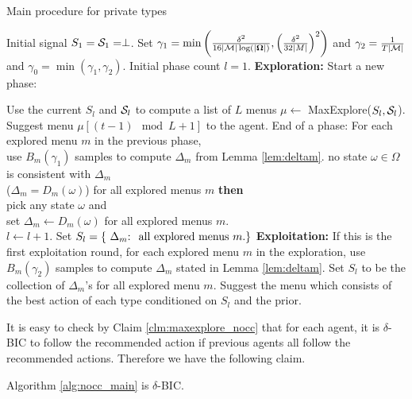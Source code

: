 \newcommand{\TAB}{\hspace{3mm}}

 \begin{algorithm}[t]
    \caption{Main procedure for private types }
    	\label{alg:nocc_main}
    \begin{algorithmic}[1]
    	\STATE Initial signal $S_1 = \S_1= \perp$.
    	\STATE Set $\gamma_1 =\min\left(\frac{\delta^2}{16|\M|\log(|\varOmega|)},\left( \frac{\delta^2}{32|M|}\right)^2\right)$ and $\gamma_2 =  \frac{1}{T|\M|}$ and $\gamma_0=\min(\gamma_1,\gamma_2)$.
	\STATE Initial phase count $l = 1$.
		\STATE \textbf{Exploration:}
			\STATE Start a new phase:
			
			\STATE Use the current $S_l$ and $\S_l$ to compute a list of $L$ menus $\mu \leftarrow $ MaxExplore($S_l, \S_l$).
		\ENDIF
		\STATE Suggest menu $\mu [ (t-1) \mod L + 1]$ to the agent.
			\STATE End of a phase:
			\STATE For each explored menu $m$ in the previous phase, \\
            \TAB use $B_m(\gamma_1)$ samples to compute $\Delta_m$ from Lemma \ref{lem:deltam}.
			 no state $\omega\in \varOmega$ is consistent with $\Delta_m$ \\
            (\ie $\Delta_m = D_m(\omega)$) for all explored menus $m$ {\bf then} \\
            \TAB pick any state $\omega$ and \\
            \TAB set $\Delta_m \leftarrow D_m(\omega)$ for all explored menus $m$. \\
			\STATE $l \leftarrow l + 1$.
			\STATE Set $S_l = \{ \text{ $\Delta_m$:\; all explored menus $m$.} \}$
		\ENDIF
	\ELSE
		\STATE \textbf{Exploitation:}
		\STATE If this is the first exploitation round, for each explored menu $m$ in the exploration, use $B_m(\gamma_2)$ samples to compute $\Delta_m$ stated in Lemma \ref{lem:deltam}. Set $S_l$ to be the collection of $\Delta_m$'s for all explored menu $m$.
		\STATE Suggest the menu which consists of the best action of each type conditioned on $S_l$ and the prior.
	\ENDIF
	\ENDFOR
     \end{algorithmic}
\end{algorithm}

It is easy to check by Claim \ref{clm:maxexplore_nocc} that for each agent, it is $\delta$-BIC to follow the recommended action if previous agents all follow the recommended actions. Therefore we have the following claim.
\begin{claim}
\label{clm:nocc_BIC}
Algorithm \ref{alg:nocc_main} is $\delta$-BIC.
\end{claim}


